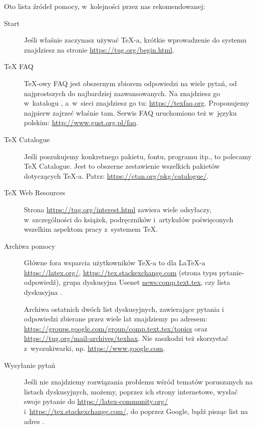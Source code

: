 \documentclass{article}
\begin{document}
Oto lista źródeł pomocy, w~kolejności przez nas rekomendowanej:
\begin{description}
\item [Start] Jeśli właśnie zaczynasz używać \TeX-a, krótkie wprowadzenie do systemu znajdziesz na stronie \url{https://tug.org/begin.html}.
\item [\TeX{} FAQ] \TeX-owy FAQ jest obszernym zbiorem
odpowiedzi na wiele pytań, od najprostszych do najbardziej
zaawansowanych. Na \TL{} znajdziesz go w~katalogu
,
a~w~sieci znajdziesz go tu: \url{https://texfaq.org}. Proponujemy
 najpierw zajrzeć właśnie tam.  Serwis {FAQ} uruchomiono też
w~języku polskim: \url{http://www.gust.org.pl/faq}.


\item [\TeX{} Catalogue] Jeśli poszukujemy konkretnego pakietu, fontu,
programu itp., to polecamy \TeX{} Catalogue. Jest to obszerne zestawienie
wszelkich pakietów dotyczących \TeX-a. Patrz:
 \url{https://ctan.org/pkg/catalogue/}.

\item [\TeX{} Web Resources] Strona \url{https://tug.org/interest.html}
zawiera wiele odsyłaczy, w~szczególności do książek, podręczników
i~artykułów poświęconych wszelkim aspektom pracy z~systemem \TeX.

\item [Archiwa pomocy] Główne fora wsparcia użytkowników \TeX-a to dla \LaTeX-a
\url{https://latex.org/},     %
 \url{https://tex.stackexchange.com} (strona typu pytanie-odpowiedź), grupa dyskusyjna Usenet \url{news:comp.text.tex}, czy
lista dyskusyjna .


Archiwa ostatnich dwóch list dyskusyjnych,
zawierające  pytania i odpowiedzi zbierane przez wiele lat znajdziemy po adresem:
\url{https://groups.google.com/group/comp.text.tex/topics} oraz
\url{https://tug.org/mail-archives/texhax}. Nie zaszkodzi też
skorzystać z~wyszukiwarki, np. \url{https://www.google.com}.

\item [Wysyłanie pytań] Jeśli   nie znajdziemy rozwiązania problemu wśród tematów poruszanych na listach dyskusyjnych,
możemy, poprzez ich strony internetowe, wysłać swoje pytanie do \url{https://latex-community.org/}  i~\url{https://tex.stackexchange.com/},
do  poprzez Google,
  bądź pisząc list na adres .


\end{description}
\end{document}
